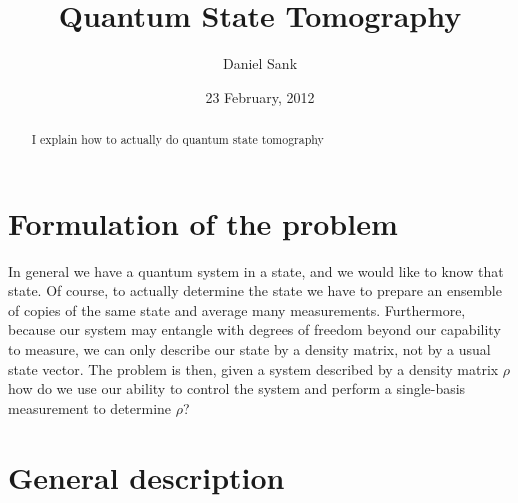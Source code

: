 \documentclass[twocolumn,english,aps,prl]{revtex4}
\begin{document}
\title{Quantum State Tomography}

\author{Daniel Sank}



\date{23 February, 2012}
\begin{abstract}
I explain how to actually do quantum state tomography
\end{abstract}
\maketitle

\section{Formulation of the problem}

In general we have a quantum system in a state, and we would like to know that state. Of course, to actually determine the state we have to prepare an ensemble of copies of the same state and average many measurements. Furthermore, because our system may entangle with degrees of freedom beyond our capability to measure, we can only describe our state by a density matrix, not by a usual state vector. The problem is then, given a system described by a density matrix $\rho$ how do we use our ability to control the system and perform a single-basis measurement to determine $\rho$?

\section{General description}
\end{document}
